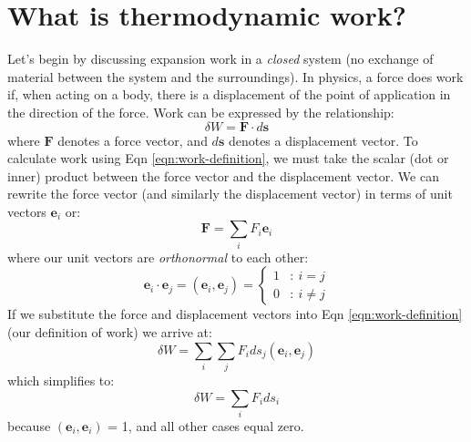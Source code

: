 \documentclass[11pt]{article}
\theoremstyle{definition}
\begin{document}
\section*{What is thermodynamic work?}
Let's begin by discussing expansion work in a \textit{closed} system (no exchange of material between the system and the surroundings).
In physics, a force does work if, when acting on a body, there is a displacement of the point of application in the direction of the force.
Work can be expressed by the relationship:
\begin{equation}\label{eqn:work-definition}
\delta{W} = \mathbf{F}\cdot d\mathbf{s}
\end{equation}where $\mathbf{F}$ denotes a force vector, and $d\mathbf{s}$ denotes a displacement vector. To calculate work using Eqn \eqref{eqn:work-definition},
we must take the scalar (dot or inner) product between the force vector and the displacement vector.
We can rewrite the force vector (and similarly the displacement vector) in terms of unit vectors $\mathbf{e}_{i}$ or:
\begin{equation}
\mathbf{F} = \sum_{i}F_{i}\mathbf{e}_{i}
\end{equation}where our unit vectors are \emph{orthonormal} to each other:
\begin{equation}
\mathbf{e}_{i}\cdot\mathbf{e}_{j} = \left(\mathbf{e}_{i},\mathbf{e}_{j}\right) = \left\{
\begin{array}{lr}
1 & : ~i=j \\
0 & : ~i\neq{j}
\end{array}
\right.
\end{equation}If we substitute the force and displacement vectors into Eqn \eqref{eqn:work-definition} (our definition of work) we arrive at:
\begin{equation}
\delta W = \sum_{i}\sum_{j} F_{i}ds_{j}\left(\mathbf{e}_{i},\mathbf{e}_{j}\right)
\end{equation}which simplifies to:
\begin{equation}\label{eqn:differential-work}
\delta W = \sum_{i} F_{i}ds_{i}
\end{equation}because $\left(\mathbf{e}_{i},\mathbf{e}_{i}\right)$ = 1, and all other cases equal zero.
\end{document}
